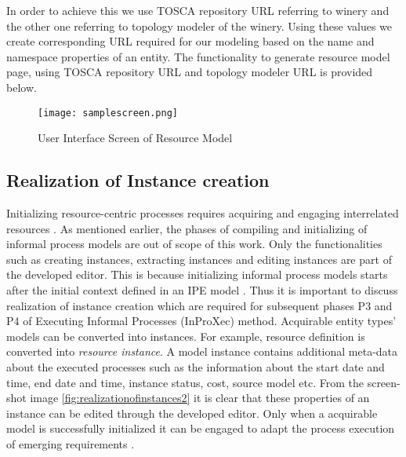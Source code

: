 In order to achieve this we use TOSCA repository URL referring to winery and the other one referring to topology modeler of the winery. Using these values we create corresponding URL required for our modeling based on the name and namespace properties of an entity. The functionality to generate resource model page, using TOSCA repository URL and topology modeler URL is provided below.

			
			
\begin{figure}
	\centering
	\texttt{[image: samplescreen.png]}
	\caption{User Interface Screen of Resource Model}
	\label{fig:realizationofresourcemodel}
\end{figure}



		
\subsection{Realization of Instance creation}
Initializing resource-centric processes requires acquiring and engaging interrelated resources \cite{Sungur2015}. As mentioned earlier, the phases of compiling and initializing of informal process models are out of scope of this work. Only the functionalities such as creating instances, extracting instances and editing instances are part of the developed editor. This is because initializing informal process models starts after the initial context defined in an IPE model \cite{Sungur2015}. Thus it is important to discuss realization of instance creation which are required for subsequent phases P3 and P4 of Executing Informal Processes (InProXec) method. Acquirable entity types' models can be converted into instances. For example, resource definition is converted into \textit{resource instance}. A model instance contains additional meta-data about the executed processes such as the information about the start date and time, end date and time, instance status, cost, source model etc. From the screen-shot image \ref{fig:realizationofinstances2} it is clear that these properties of an instance can be edited through the developed editor. Only when a acquirable model is successfully initialized it can be engaged to adapt the process execution of emerging requirements \cite{Sungur2015}. 


